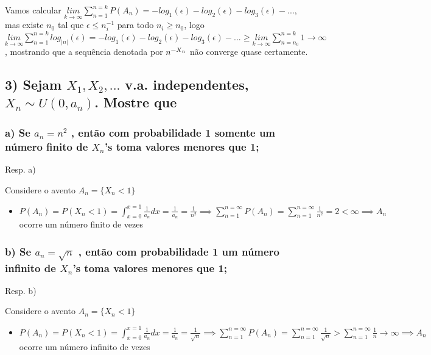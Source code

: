 \documentclass[portuguese]{article}
\begin{document}
Vamos calcular $\underset{k\rightarrow\infty}{lim}\sum_{n=1}^{n=k}P(A_{n})=-log_{1}(\epsilon)-log_{2}(\epsilon)-log_{3}(\epsilon)-...$,
mas existe $n_{0}$ tal que $\epsilon\le n_{i}^{-1}$ para todo $n_{i}\ge n_{0}$,
logo $\underset{k\rightarrow\infty}{lim}\sum_{n=1}^{n=k}log_{\left|n\right|}(\epsilon)=-log_{1}(\epsilon)-log_{2}(\epsilon)-log_{3}(\epsilon)-...\ge\underset{k\rightarrow\infty}{lim}\sum_{n=n_{0}}^{n=k}1\to\infty$,
mostrando que a sequência denotada por $n^{\text{\textminus}X_{n}}$
não converge quase certamente.


\subsection*{\textcompwordmark{}}


\subsection*{\textmd{3) Sejam $X_{1},X_{2},...$ v.a. independentes, $X_{n}\sim U(0,a_{n})$.
Mostre que}}


\subsubsection*{\textmd{a) Se $a_{n}=n^{2}$ , então com probabilidade 1 somente
um número finito de $X_{n}$\textquoteright s toma valores menores
que 1;}}

Resp. a) 

Considere o avento $A_{n}=\{X_{n}<1\}$
\begin{itemize}
\item $P(A_{n})=P(X_{n}<1)=\int_{x=0}^{x=1}\frac{1}{a_{n}}dx=\frac{1}{a_{n}}=\frac{1}{n^{2}}\implies\sum_{n=1}^{n=\infty}P(A_{n})=\sum_{n=1}^{n=\infty}\frac{1}{n^{2}}=2<\infty\implies A_{n}$
ocorre um número finito de vezes
\end{itemize}

\subsubsection*{\textmd{b) Se $a_{n}=\sqrt{n}$ , então com probabilidade 1 um número
infinito de $X_{n}$\textquoteright s toma valores menores que 1;}}

Resp. b)

Considere o avento $A_{n}=\{X_{n}<1\}$
\begin{itemize}
\item $P(A_{n})=P(X_{n}<1)=\int_{x=0}^{x=1}\frac{1}{a_{n}}dx=\frac{1}{a_{n}}=\frac{1}{\sqrt{n}}\implies\sum_{n=1}^{n=\infty}P(A_{n})=\sum_{n=1}^{n=\infty}\frac{1}{\sqrt{n}}>\sum_{n=1}^{n=\infty}\frac{1}{n}\rightarrow\infty\implies A_{n}$
ocorre um número infinito de vezes
\end{itemize}
\end{document}
